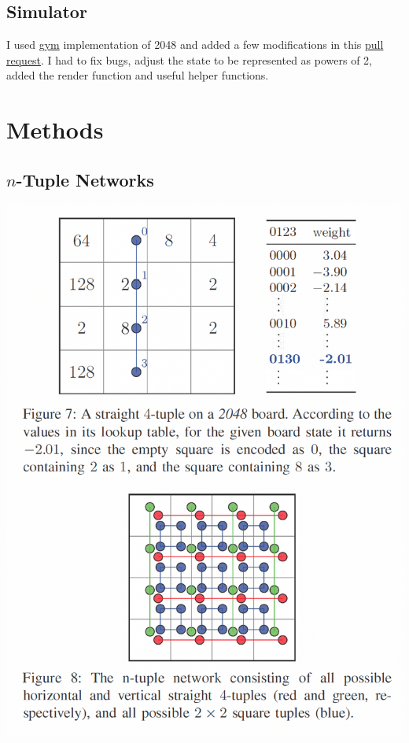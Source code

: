 \documentclass[letterpaper]{article} %
\begin{document}
\subsection{Simulator}


I used \href{https://pypi.org/project/gym-2048/}{gym} implementation of 2048 and added a few modifications in this \href{https://github.com/h0rban/gym-2048}{pull request}. I had to fix bugs, adjust the state to be represented as powers of 2, added the render function and useful helper functions.


\section{Methods}

\subsection{$n$-Tuple Networks}

\begin{center}
    \includegraphics[scale=.5]{images/ntuple-network.png}
\end{center}
\end{document}
